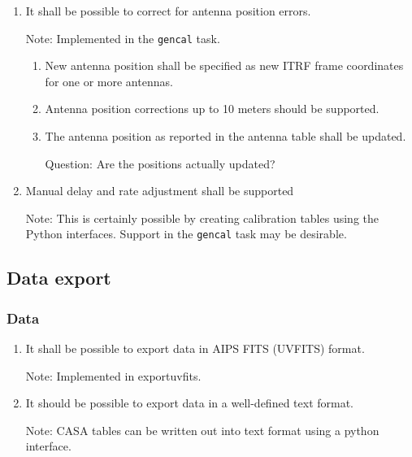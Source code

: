 \documentclass[11pt,a4paper]{article}
\begin{document}
\begin{enumerate}[subsubseclist]

\item It shall be possible to correct for antenna position errors.

  Note: Implemented in the \texttt{gencal} task.

  \begin{enumerate}[subsubsecsublist]

  \item New antenna position shall be specified as new ITRF frame
    coordinates for one or more antennas.

  \item Antenna position corrections up to 10 meters should be supported.

  \item The antenna position as reported in the antenna table shall
    be updated.

    Question: Are the positions actually updated?

  \end{enumerate}

\item Manual delay and rate adjustment shall be supported

  Note: This is certainly possible by creating calibration tables
  using the Python interfaces.  Support in the \texttt{gencal} task
  may be desirable.

\end{enumerate}

\subsection{Data export}

\subsubsection{Data}

\begin{enumerate}[subsubseclist]

\item It shall be possible to export data in AIPS FITS (UVFITS) format.

  Note: Implemented in exportuvfits.
  
\item It should be possible to export data in a well-defined text format.

  Note: CASA tables can be written out into text format using a python
  interface.
  
\end{enumerate}
\end{document}

